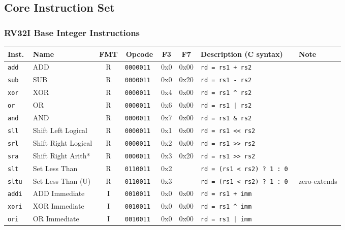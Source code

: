 \subsection*{Core Instruction Set}

\subsubsection*{RV32I Base Integer Instructions}

\begin{tabular}
{l | l | c | c | c | c | l | l} \hline
Inst.     & Name                    & FMT& Opcode       & F3  & F7    & Description (C syntax)        & Note     \\ \hline
\tt{add}  & ADD                     & R  & \tt{0000011} & 0x0 & 0x00  & \tt{rd = rs1 + rs2}           & \\
\tt{sub}  & SUB                     & R  & \tt{0000011} & 0x0 & 0x20  & \tt{rd = rs1 - rs2}           & \\
\tt{xor}  & XOR                     & R  & \tt{0000011} & 0x4 & 0x00  & \tt{rd = rs1 \^{} rs2}        & \\
\tt{or}   & OR                      & R  & \tt{0000011} & 0x6 & 0x00  & \tt{rd = rs1 | rs2}           & \\
\tt{and}  & AND                     & R  & \tt{0000011} & 0x7 & 0x00  & \tt{rd = rs1 \& rs2}          & \\
\tt{sll}  & Shift Left Logical      & R  & \tt{0000011} & 0x1 & 0x00  & \tt{rd = rs1 << rs2}          & \\
\tt{srl}  & Shift Right Logical     & R  & \tt{0000011} & 0x2 & 0x00  & \tt{rd = rs1 >> rs2}          & \\
\tt{sra}  & Shift Right Arith*      & R  & \tt{0000011} & 0x3 & 0x20  & \tt{rd = rs1 >> rs2}          & \\
\tt{slt}  & Set Less Than           & R  & \tt{0110011} & 0x2 &       & \tt{rd = (rs1 < rs2) ? 1 : 0} & \\
\tt{sltu} & Set Less Than (U)       & R  & \tt{0110011} & 0x3 &       & \tt{rd = (rs1 < rs2) ? 1 : 0} & zero-extends \\ \hline
\tt{addi} & ADD Immediate           & I  & \tt{0010011} & 0x0 & 0x00  & \tt{rd = rs1 + imm}           & \\
\tt{xori} & XOR Immediate           & I  & \tt{0010011} & 0x0 & 0x00  & \tt{rd = rs1 \^{} imm}        & \\
\tt{ori}  & OR Immediate            & I  & \tt{0010011} & 0x0 & 0x00  & \tt{rd = rs1 | imm}           & \\

\end{tabular}
